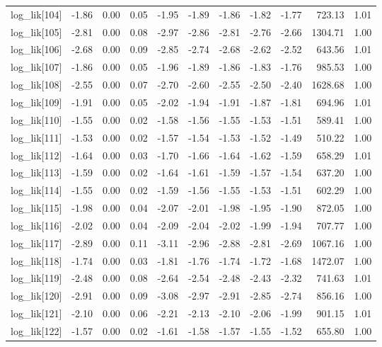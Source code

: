 \begin{table}[ht]
\begin{tabular}{rrrrrrrrrrr}
  log\_lik[104] & -1.86 & 0.00 & 0.05 & -1.95 & -1.89 & -1.86 & -1.82 & -1.77 & 723.13 & 1.01 \\ 
  log\_lik[105] & -2.81 & 0.00 & 0.08 & -2.97 & -2.86 & -2.81 & -2.76 & -2.66 & 1304.71 & 1.00 \\ 
  log\_lik[106] & -2.68 & 0.00 & 0.09 & -2.85 & -2.74 & -2.68 & -2.62 & -2.52 & 643.56 & 1.01 \\ 
  log\_lik[107] & -1.86 & 0.00 & 0.05 & -1.96 & -1.89 & -1.86 & -1.83 & -1.76 & 985.53 & 1.00 \\ 
  log\_lik[108] & -2.55 & 0.00 & 0.07 & -2.70 & -2.60 & -2.55 & -2.50 & -2.40 & 1628.68 & 1.00 \\ 
  log\_lik[109] & -1.91 & 0.00 & 0.05 & -2.02 & -1.94 & -1.91 & -1.87 & -1.81 & 694.96 & 1.01 \\ 
  log\_lik[110] & -1.55 & 0.00 & 0.02 & -1.58 & -1.56 & -1.55 & -1.53 & -1.51 & 589.41 & 1.00 \\ 
  log\_lik[111] & -1.53 & 0.00 & 0.02 & -1.57 & -1.54 & -1.53 & -1.52 & -1.49 & 510.22 & 1.00 \\ 
  log\_lik[112] & -1.64 & 0.00 & 0.03 & -1.70 & -1.66 & -1.64 & -1.62 & -1.59 & 658.29 & 1.01 \\ 
  log\_lik[113] & -1.59 & 0.00 & 0.02 & -1.64 & -1.61 & -1.59 & -1.57 & -1.54 & 637.20 & 1.00 \\ 
  log\_lik[114] & -1.55 & 0.00 & 0.02 & -1.59 & -1.56 & -1.55 & -1.53 & -1.51 & 602.29 & 1.00 \\ 
  log\_lik[115] & -1.98 & 0.00 & 0.04 & -2.07 & -2.01 & -1.98 & -1.95 & -1.90 & 872.05 & 1.00 \\ 
  log\_lik[116] & -2.02 & 0.00 & 0.04 & -2.09 & -2.04 & -2.02 & -1.99 & -1.94 & 707.77 & 1.00 \\ 
  log\_lik[117] & -2.89 & 0.00 & 0.11 & -3.11 & -2.96 & -2.88 & -2.81 & -2.69 & 1067.16 & 1.00 \\ 
  log\_lik[118] & -1.74 & 0.00 & 0.03 & -1.81 & -1.76 & -1.74 & -1.72 & -1.68 & 1472.07 & 1.00 \\ 
  log\_lik[119] & -2.48 & 0.00 & 0.08 & -2.64 & -2.54 & -2.48 & -2.43 & -2.32 & 741.63 & 1.01 \\ 
  log\_lik[120] & -2.91 & 0.00 & 0.09 & -3.08 & -2.97 & -2.91 & -2.85 & -2.74 & 856.16 & 1.00 \\ 
  log\_lik[121] & -2.10 & 0.00 & 0.06 & -2.21 & -2.13 & -2.10 & -2.06 & -1.99 & 901.15 & 1.01 \\ 
  log\_lik[122] & -1.57 & 0.00 & 0.02 & -1.61 & -1.58 & -1.57 & -1.55 & -1.52 & 655.80 & 1.00 \\ 

\end{tabular}
\end{table}
